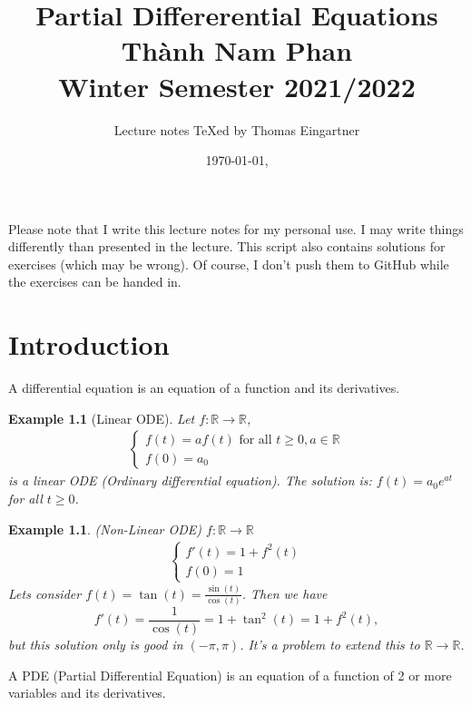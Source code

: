 \documentclass{report}
\title{Partial Differerential Equations \\ Thành Nam Phan \\ Winter Semester 2021/2022}
\author{Lecture notes \TeX{}ed by Thomas Eingartner}
\date{\today, \currenttime}
\theoremstyle{tommy}
\newtheorem{eg}[defn]{Example}
\begin{document}
  \maketitle
  \tableofcontents
  \newpage
  Please note that I write this lecture notes for my personal use. I may write things differently than presented in the lecture. This script also contains solutions for exercises (which may be wrong). Of course, I don't push them to GitHub while the exercises can be handed in.
  \newpage

  \chapter{Introduction}

  A differential equation is an equation of a function and its derivatives. 

  \begin{eg}[Linear ODE]
    Let \(f: \mathbb{R} \to \mathbb{R}\),
    \begin{align*}
      \begin{cases}
        f(t) = a f(t) \text{ for all } t \ge 0, a \in \mathbb{R} \\
        f(0) = a_0
      \end{cases}
    \end{align*}
    is a linear ODE (Ordinary differential equation). The solution is: \(f(t) = a_0 e^{at}\) for all \(t \ge 0\).
  \end{eg}

  \begin{eg} (Non-Linear ODE) \(f: \mathbb{R} \to \mathbb{R}\)
    \begin{align*}
      \begin{cases}
        f'(t) = 1 + f^2(t) \\
        f(0) = 1
      \end{cases}
    \end{align*}
    Lets consider \(f(t) = \tan(t) = \frac{\sin(t)}{\cos(t)}\). Then we have \[f'(t) = \frac{1}{\cos(t)} = 1 + \tan^2(t) = 1 + f^2(t),\] but this solution only is \emph{good} in \((- \pi, \pi)\). It's a problem to extend this to \(\mathbb{R} \to \mathbb{R}\).
  \end{eg}

  A PDE (Partial Differential Equation) is an equation of a function of 2 or more variables and its derivatives.
\end{document}
